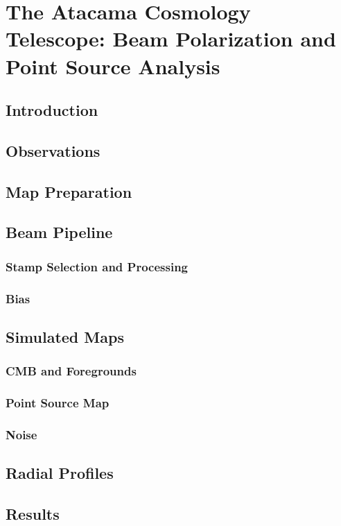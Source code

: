 \chapter{The Atacama Cosmology Telescope: Beam Polarization and Point Source Analysis}
\label{ch:actbeams}
\section{Introduction}
\label{sec:sec_act}

\section{Observations}

\section{Map Preparation}

\section{Beam Pipeline}
\subsection{Stamp Selection and Processing}
\subsection{Bias}

\section{Simulated Maps}
\subsection{CMB and Foregrounds}
\subsection{Point Source Map}
\subsection{Noise}

\section{Radial Profiles}
\section{Results}
